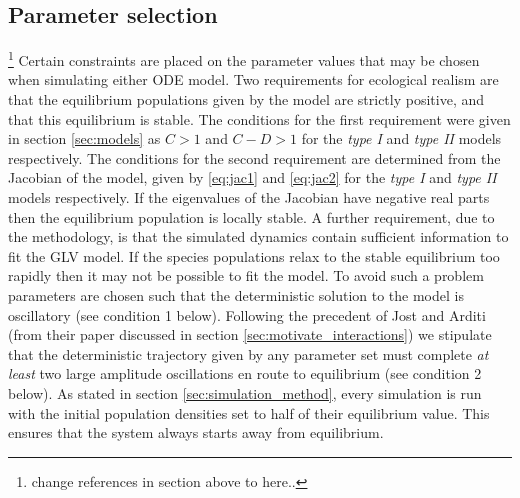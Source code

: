 
\subsection{Parameter selection}
\label{sec:param_selection}
\footnote{change references in section above to here..}
Certain constraints are placed on the parameter values that may be chosen when simulating either ODE model. Two requirements for ecological realism are that the equilibrium populations given by the model are strictly positive, and that this equilibrium is stable. The conditions for the first requirement were given in section \ref{sec:models} as $C>1$ and $C-D>1$ for the \emph{type I} and \emph{type II} models respectively. The conditions for the second requirement are determined from the Jacobian of the model, given by \eqref{eq:jac1} and \eqref{eq:jac2} for the \emph{type I} and \emph{type II} models respectively. If the eigenvalues of the Jacobian have negative real parts then the equilibrium population is locally stable. A further requirement, due to the methodology, is that the simulated dynamics contain sufficient information to fit the GLV model. If the species populations relax to the stable equilibrium too rapidly then it may not be possible to fit the model. To avoid such a problem parameters are chosen such that the deterministic solution to the model is oscillatory (see condition 1 below). Following the precedent of Jost and Arditi (from their paper \cite{jost2000identifying} discussed in section \ref{sec:motivate_interactions}) we stipulate that the deterministic trajectory given by any parameter set must complete \emph{at least} two large amplitude oscillations en route to equilibrium (see condition 2 below). As stated in section \ref{sec:simulation_method}, every simulation is run with the initial population densities set to half of their equilibrium value. This ensures that the system always starts away from equilibrium.

